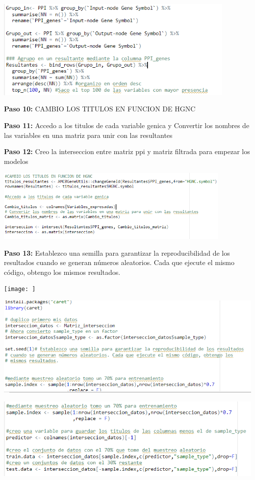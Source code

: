 \documentclass[
]{article}
\begin{document}
\includegraphics[width=4.63542in,height=\textheight]{images/GRUPOS.png}

\textbf{Paso 10:} CAMBIO LOS TITULOS EN FUNCION DE HGNC

\textbf{Paso 11:} Accedo a los titulos de cada variable genica y
Convertir los nombres de las variables en una matriz para unir con las
resultantes

\textbf{Paso 12:} Creo la interseccion entre matriz ppi y matriz
filtrada para empezar los modelos

\includegraphics[width=4.55208in,height=\textheight]{images/titulos.png}

\textbf{Paso 13:} Establezco una semilla para garantizar la
reproducibilidad de los resultados cuando se generan números aleatorios.
Cada que ejecute el mismo código, obtengo los mismos resultados.

\texttt{[image: ]}

\includegraphics{images/knn1-01.png}

\includegraphics{images/knn2.png}
\end{document}
